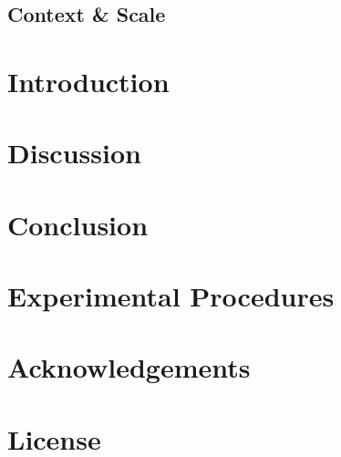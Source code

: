 \documentclass[12pt,1p]{elsarticle}
\begin{document}
\begin{shaded}
\vspace{-0.5cm}
\section*{Context \& Scale}

\end{shaded}

\section*{Introduction}
\label{sec:intro}






\section*{Discussion}
\label{sec:discussion}



\section*{Conclusion}
\label{sec:conclusion}



\section*{Experimental Procedures}
\label{sec:methods}

\begin{small}

\end{small}

\section*{Acknowledgements}
\small


\section*{License}
\end{document}

